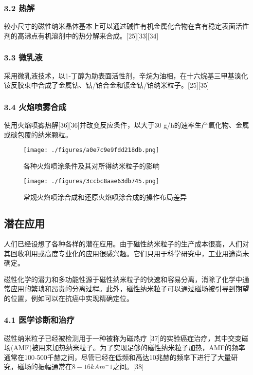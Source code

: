 \subsubsection{3.2 热解}
较小尺寸的磁性纳米晶体基本上可以通过碱性有机金属化合物在含有稳定表面活性剂的高沸点有机溶剂中的热分解来合成。[25][33][34]

\subsubsection{3.3 微乳液}
采用微乳液技术，以1-丁醇为助表面活性剂，辛烷为油相，在十六烷基三甲基溴化铵反胶束中合成了金属钴、钴/铂合金和镀金钴/铂纳米粒子。[25][35]

\subsubsection{3.4 火焰喷雾合成}
使用火焰喷雾热解[36][36]并改变反应条件，以大于30 g/h的速率生产氧化物、金属或碳包覆的纳米颗粒。
\begin{figure}[ht]
\centering
\texttt{[image: ./figures/a0e7c9e9fdd218db.png]}
\caption{各种火焰喷涂条件及其对所得纳米粒子的影响} \label{fig_CXNMLZ_3}
\end{figure}
\begin{figure}[ht]
\centering
\texttt{[image: ./figures/3ccbc8aae63db745.png]}
\caption{常规火焰喷涂合成和还原火焰喷涂合成的操作布局差异} \label{fig_CXNMLZ_4}
\end{figure}

\subsection{潜在应用}
人们已经设想了各种各样的潜在应用。由于磁性纳米粒子的生产成本很高，人们对其回收利用或高度专业化的应用很感兴趣。它们只用于科学研究中，工业用途尚未确定。

磁性化学的潜力和多功能性源于磁性纳米粒子的快速和容易分离，消除了化学中通常应用的繁琐和昂贵的分离过程。此外，磁性纳米粒子可以通过磁场被引导到期望的位置，例如可以在抗癌中实现精确定位。

\subsubsection{4.1 医学诊断和治疗}
磁性纳米粒子已经被检测用于一种被称为磁热疗 [37]的实验癌症治疗，其中交变磁场(AMF)被用来加热纳米粒子。为了实现足够的磁性纳米粒子加热，AMF的频率通常在100-500千赫之间，尽管已经在低频和高达10兆赫的频率下进行了大量研究，磁场的振幅通常在$8-16 kAm^-1$之间。[38]

